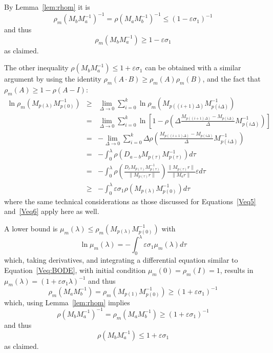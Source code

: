 \documentclass[11pt]{article}
\newcommand{\e}{\varepsilon}
\newcommand{\s}{\sigma}
\renewcommand{\l}{\lambda}
\begin{document}
By Lemma~\ref{lem:rhom} it is
\[ \rho_m(M_b M_a^{-1})^{-1} =  \rho(M_{a} M_b^{-1})^{-1} \le (1 - \e\s_1)^{-1} \]
and thus
\[  \rho_m(M_b M_a^{-1}) \ge 1 - \e\s_1 \]
as claimed. 






The other inequality $\rho(M_b M_a^{-1}) \le 1+\e\s_1$ can be obtained with a similar argument
	by using the identity $\rho_m(A\cdot B) \ge \rho_m(A) \rho_m(B)$, and the fact that $\rho_m(A)\ge 1 - \rho(A-I)$:
\begin{eqnarray*}
 \ln\rho_m(M_{p(\l)} M_{p(0)}^{-1}) & \ge & \displaystyle{\lim_{\Delta\rightarrow 0} \sum_{i=0}^{k} \ln\rho_m(M_{p((i+1)\Delta)} M_{p(i\Delta)}^{-1})} \\
 					  & = & \displaystyle{\lim_{\Delta\rightarrow 0} \sum_{i=0}^{k} \ln\left[1 - \rho(\Delta \frac{M_{p((i+1)\Delta)} - M_{p(i\Delta)}}{\Delta} M_{p(i\Delta)}^{-1})\right] } \\
				    & = & -\displaystyle{\lim_{\Delta\rightarrow 0} \sum_{i=0}^{k} \Delta \rho(\frac{M_{p((i+1)\Delta)} - M_{p(i\Delta)}}{\Delta} M_{p(i\Delta)}^{-1}) } \\
				         & = & -\displaystyle{ \int_{0}^{\l} \rho(D_{a-b} M_{p(\tau)} M_{p(\tau)}^{-1}) d\tau } \\
				         & = & -\displaystyle{ \int_{0}^{\l} \rho(\frac{D_r M_{p(\tau)} M_{p(\tau)}^{-1}}{\|M_{p(\tau)} r\|}) \frac{\|M_{p(\tau)} r\|}{\|M_a r\|} \e d\tau } \\
				         & \ge &- \displaystyle{ \int_{0}^{\l} \e\s_1 \rho(M_{p(\l)} M_{p(0)}^{-1}) d\tau}
\end{eqnarray*}
where the same technical considerations as those discussed for Equations~\ref{Veq5} and~\ref{Veq6} apply here as well. 

A lower bound is $\mu_m(\l) \le \rho_m(M_{p(\l)} M_{p(0)}^{-1})$ with
\[ \ln\mu_m(\l)= -\displaystyle{ \int_{0}^{\l} \e\s_1 \mu_m(\l) d\tau}  \] 
which, taking derivatives, and integrating a differential equation similar to Equation~\ref{Veq:BODE}, with initial condition $\mu_m(0) = \rho_m(I)=1$, results in $\mu_m(\l) = (1 + \e\s_1\l)^{-1}$
and thus
\[  \rho_m(M_a M_b^{-1}) = \rho_m(M_{p(1)} M_{p(0)}^{-1}) \ge (1 + \e\s_1)^{-1} \]
which, using Lemma~\ref{lem:rhom} implies
\[ \rho(M_b M_a^{-1})^{-1} =  \rho_m(M_a M_b^{-1}) \ge (1 + \e\s_1)^{-1} \]
and thus
\begin{equation}\label{tech2}
 \rho(M_b M_a^{-1}) \le 1 + \e\s_1 
\end{equation} 
as claimed. 
\end{document}
